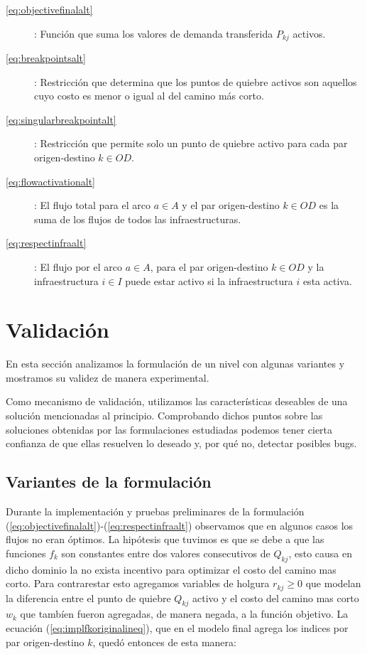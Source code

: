 \documentclass{article}
\begin{document}
  \begin{description}
    \item[\ref{eq:objectivefinalalt}]: Función que suma los valores de demanda transferida $P_{kj}$ activos.
    \item[\ref{eq:breakpointsalt}]: Restricción que determina que los puntos de quiebre activos son aquellos cuyo costo es menor o igual al del camino más corto.
    \item[\ref{eq:singularbreakpointalt}]: Restricción que permite solo un punto de quiebre activo para cada par origen-destino $k \in OD$.
    \item[\ref{eq:flowactivationalt}]: El flujo total para el arco $a \in A$ y el par origen-destino $k \in OD$ es la suma de los flujos de todos las infraestructuras.
    \item[\ref{eq:respectinfraalt}]: El flujo por el arco $a \in A$, para el par origen-destino $k \in OD$ y la infraestructura $i \in I$ puede estar activo si la infraestructura $i$ esta activa.
  \end{description}

  \section{Validación}

  En esta sección analizamos la formulación de un nivel con algunas variantes y mostramos su validez de manera experimental.

  Como mecanismo de validación, utilizamos las características deseables de una solución mencionadas al principio. Comprobando dichos puntos sobre las soluciones obtenidas por las formulaciones estudiadas podemos tener cierta confianza de que ellas resuelven lo deseado y, por qué no, detectar posibles bugs.

  \subsection{Variantes de la formulación}

  Durante la implementación y pruebas preliminares de la formulación (\ref{eq:objectivefinalalt})-(\ref{eq:respectinfraalt}) observamos que en algunos casos los flujos no eran óptimos. La hipótesis que tuvimos es que se debe a que las funciones $f_k$ son constantes entre dos valores consecutivos de $Q_{kj}$, esto causa en dicho dominio la no exista incentivo para optimizar el costo del camino mas corto. Para contrarestar esto agregamos variables de holgura $r_{kj} \geq 0$ que modelan la diferencia entre el punto de quiebre $Q_{kj}$ activo y el costo del camino mas corto $w_k$ que tambíen fueron agregadas, de manera negada, a la función objetivo. La ecuación (\ref{eq:implfkoriginalineq}), que en el modelo final agrega los indices por par origen-destino $k$, quedó entonces de esta manera:
\end{document}
